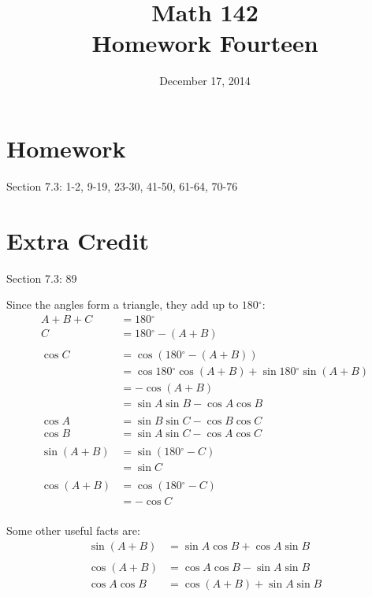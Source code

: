 \documentclass{exam}
\author{}
\date{December 17, 2014}
\title{Math 142 \\ Homework Fourteen}
\newcommand{\dg}{\ensuremath{^\circ}}
\begin{document}
  \maketitle

  \section{Homework}
  Section 7.3: 1-2, 9-19, 23-30, 41-50, 61-64, 70-76

  \section{Extra Credit}
  Section 7.3: 89

  \ifprintanswers
    Since the angles form a triangle, they add up to $180 \dg$:
    \begin{align*}
      A + B + C & = 180 \dg \\
      C         & = 180 \dg - (A + B) \\
      \\
      \cos C & = \cos (180 \dg - (A + B)) \\
             & = \cos 180 \dg \cos (A + B) + \sin 180 \dg \sin (A + B) \\
             & = - \cos (A + B) \\
             & = \sin A \sin B - \cos A \cos B \\
             \\
      \cos A &= \sin B \sin C - \cos B \cos C \\
      \cos B &= \sin A \sin C - \cos A \cos C \\
      \\
      \sin (A + B) & = \sin (180 \dg - C) \\
                   & = \sin C \\
      \\
      \cos (A + B) & = \cos (180 \dg - C) \\
                   & = - \cos C \\
    \end{align*}

    Some other useful facts are:
    \begin{align*}
      \sin (A + B) &= \sin A \cos B + \cos A \sin B \\
      \\
      \cos (A + B)  & = \cos A \cos B - \sin A \sin B \\
      \cos A \cos B & = \cos (A + B) + \sin A \sin B \\
    \end{align*}
    
\end{document}
